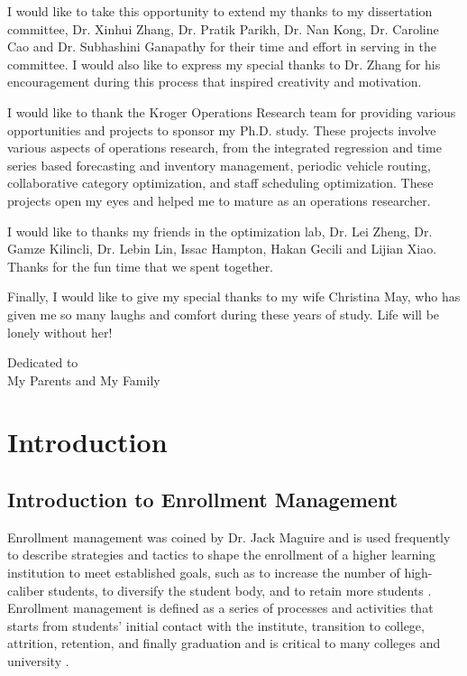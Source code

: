 \documentclass[12pt,english]{report}
\begin{document}
\setlength{\parindent}{2em}

I would like to take this opportunity to extend my thanks to my dissertation
committee,  Dr. Xinhui Zhang, Dr. Pratik Parikh, Dr. Nan Kong, Dr. Caroline Cao
and Dr. Subhashini Ganapathy for their time and effort in serving in the
committee.  I would also like to express my special thanks to Dr. Zhang for his
encouragement during this process that inspired creativity and motivation.

I would like to thank the Kroger Operations Research team for providing various
opportunities and projects to sponsor my Ph.D. study.  These projects involve
various aspects of operations research, from the integrated regression and time
series based forecasting and inventory management,  periodic vehicle routing,
collaborative category optimization, and staff scheduling optimization.  These
projects open my eyes and helped me to mature as an operations researcher.

I would like to thanks my friends in the optimization lab,  Dr. Lei Zheng, Dr.
Gamze Kilincli, Dr. Lebin Lin, Issac Hampton, Hakan Gecili and Lijian Xiao.
Thanks for the fun time that we spent together.

Finally, I would like to give my special thanks to my wife Christina May, who
has given me so many laughs and comfort during these years of study.  Life will
be lonely without her!

%
\newpage
\thispagestyle{plain}
\vspace*{3in}
\begin{center}
	Dedicated to\\
	My Parents and My Family
\end{center}
%
%
%

\newpage
\setcounter{page}{1}
\setlength{\parindent}{2em}
\chapter{Introduction}

\section{Introduction to Enrollment Management}

Enrollment management was coined by Dr. Jack Maguire \citep{Maguire1976} and is
used frequently to describe strategies and tactics to shape the enrollment of a
higher learning institution to meet established goals, such as to increase the
number of high-caliber students, to diversify the student body, and to retain
more students \citep{Kemerer1982}.   Enrollment management is defined as a
series of processes and activities that starts from students' initial contact
with the institute, transition to college, attrition, retention, and finally
graduation \citep{Hossler1990} and is critical to many colleges and university
\citep{Braunstein1999, Maltz2007, Aksenova2006}.
\end{document}
